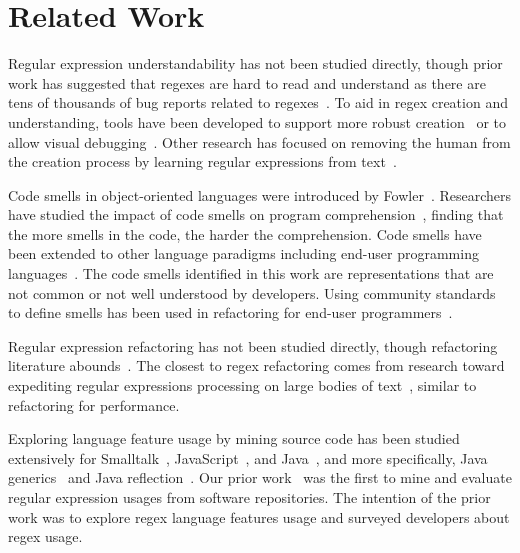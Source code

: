 \section{Related Work}
\label{sec:related}
Regular expression understandability has not been studied directly, though prior work has suggested that regexes are hard to read and understand as there are tens of thousands of bug reports related to regexes~\cite{Spishak:2012:TSR:2318202.2318207}. 
To aid in regex creation and understanding,  tools have been developed to support more robust creation~\cite{Spishak:2012:TSR:2318202.2318207} or to allow visual debugging~\cite{Beck:2014:RVD:2591062.2591111}. Other research has focused on removing the human from the creation process by learning regular expressions from  text~\cite{Babbar:2010:CBA:1871840.1871848, Li:2008:REL:1613715.1613719}.

Code smells in object-oriented languages were introduced by Fowler~\cite{Fowl1999}. Researchers have studied the impact of code smells on program comprehension~\cite{abbes2011empirical, du2006does}, finding that the more smells in the code, the harder the comprehension. 
Code smells have been extended to other language paradigms including end-user programming languages~\cite{Hermans2012intra, Hermans2012intraExt, stoleeicse, stoleeTSE}. The code smells identified in this work are representations that are not common or not well understood by developers. Using community standards to define smells has been used in refactoring   for end-user programmers~\cite{stoleeicse, stoleeTSE}. 

Regular expression refactoring has not been studied directly, though refactoring literature abounds~\cite{Mens:2004:SSR:972215.972286, Opdyke:1992:ROF:169783, Griswold:1993:AAP:152388.152389}. 
The closest to regex refactoring comes from research toward  expediting  regular expressions processing on large bodies of text~\cite{Baeza-Yates:1996:FTS:235809.235810},  similar to refactoring for performance. 


Exploring language feature usage by mining source code has been studied extensively for
Smalltalk~\cite{Callau:2011:DUD:1985441.1985448},
JavaScript~\cite{Richards:2010:ADB:1809028.1806598},
and Java~\cite{Dyer:2014:MBA:2568225.2568295, Grechanik:2010:EIL:1852786.1852801, Parnin:2013:AUJ:2589712.2589717, Livshits:2005:RAJ:2099708.2099724},
and more specifically,
Java generics~\cite{Parnin:2013:AUJ:2589712.2589717} and
Java reflection~\cite{Livshits:2005:RAJ:2099708.2099724}.
Our prior work~\cite{chapman2016} was the first to mine and evaluate regular expression usages from software repositories. 
The intention of the prior work was to explore regex language features  usage and surveyed developers about regex usage. 

